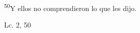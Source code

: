 \documentclass[../../rosario.tex]{subfiles}
\begin{document}
    \textsuperscript{50}Y ellos no comprendieron lo que les dijo.
    \begin{flushright}
    Lc. 2, 50        
    \end{flushright}
\end{document}
